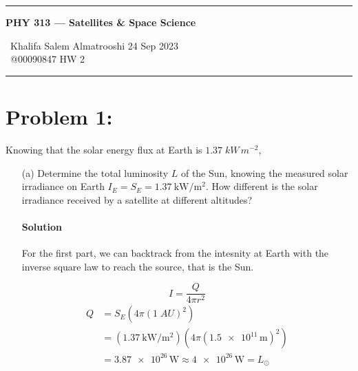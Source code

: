 \documentclass{article}
\begin{document}
	
	\begin{center}
		\hrule
		\vspace{0.4cm}
		{\textbf { \large PHY 313 --- Satellites \& Space Science}}
		\vspace{0.4cm}
	\end{center}
	{ \ Khalifa Salem Almatrooshi \hspace{\fill}  24 Sep 2023 \\
		{ } \ @00090847 \hspace{\fill}  HW 2 \\
		\hrule	

	\section*{Problem 1: }
	\boldmath
	Knowing that the solar energy flux at Earth is $ 1.37 \; kW \, m^{-2} $, \\
	\begin{enumerate}
		\item[(a)] Determine the total luminosity $L$ of the Sun, knowing the measured solar irradiance on Earth $I_E = S_E = \SI{1.37}{\kilo\watt\per\meter\squared}$. How different is the solar irradiance received by a satellite at different altitudes?
		\paragraph{Solution} For the first part, we can backtrack from the intesnity at Earth with the inverse square law to reach the source, that is the Sun. \unboldmath  		

		\[
			I = \frac{Q}{4\pi r^2}
		\]
		\begin{equation*}
			\begin{split}
				Q &= S_E ( 4\pi (1 \; AU)^2 ) \\
				&= ( \SI{1.37}{\kilo\watt\per\meter\squared} ) ( 4\pi ( \num{1.5e11} \, \unit{\meter} )^2 ) \\
				&= \num{3.87e26} \, \unit{\watt} \approx \num{4e26} \, \unit{\watt} = L_{\odot}
			\end{split}
		\end{equation*}
		

\end{enumerate}}
\end{document}
